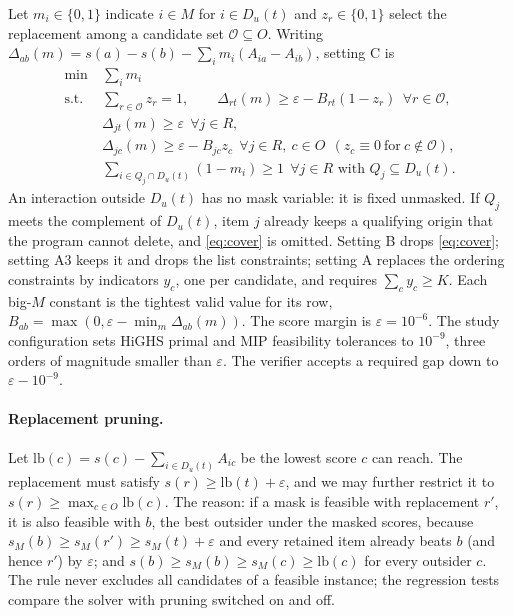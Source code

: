 \documentclass[11pt]{article}
\begin{document}
Let $m_i\in\{0,1\}$ indicate $i\in M$ for $i\in D_u(t)$ and $z_r\in\{0,1\}$ select the replacement among a candidate
set $\mathcal{O}\subseteq O$. Writing $\Delta_{ab}(m)=s(a)-s(b)-\sum_im_i(A_{ia}-A_{ib})$, setting C is
\begin{align}
\min\ &\textstyle\sum_i m_i \nonumber\\
\text{s.t. }&\textstyle\sum_{r\in\mathcal{O}}z_r=1, \qquad \Delta_{rt}(m)\ge\varepsilon-B_{rt}(1-z_r)\ \ \forall r\in\mathcal{O},\\
&\Delta_{jt}(m)\ge\varepsilon\ \ \forall j\in R,\\
&\Delta_{jc}(m)\ge\varepsilon-B_{jc}z_c\ \ \forall j\in R,\ c\in O\ \ (z_c\equiv0\ \text{for}\ c\notin\mathcal{O}),\label{eq:threat}\\
&\textstyle\sum_{i\in Q_j\cap D_u(t)}(1-m_i)\ge1\ \ \forall j\in R \text{ with } Q_j\subseteq D_u(t).\label{eq:cover}
\end{align}
An interaction outside $D_u(t)$ has no mask variable: it is fixed unmasked. If $Q_j$ meets the complement of
$D_u(t)$, item $j$ already keeps a qualifying origin that the program cannot delete, and \eqref{eq:cover} is omitted.
Setting B drops \eqref{eq:cover}; setting A3 keeps it and drops the list constraints; setting A replaces the ordering
constraints by indicators $y_c$, one per candidate, and requires $\sum_cy_c\ge K$. Each big-$M$ constant is the
tightest valid value for its row, $B_{ab}=\max(0,\varepsilon-\min_m\Delta_{ab}(m))$. The score margin is
$\varepsilon=10^{-6}$. The study configuration sets HiGHS primal and MIP feasibility tolerances to $10^{-9}$, three
orders of magnitude smaller than $\varepsilon$. The verifier accepts a required gap down to $\varepsilon-10^{-9}$.

\paragraph{Replacement pruning.} Let $\mathrm{lb}(c)=s(c)-\sum_{i\in D_u(t)}A_{ic}$ be the lowest score $c$ can reach.
The replacement must satisfy $s(r)\ge\mathrm{lb}(t)+\varepsilon$, and we may further restrict it to
$s(r)\ge\max_{c\in O}\mathrm{lb}(c)$. The reason: if a mask is feasible with replacement $r'$, it is also feasible with
$b$, the best outsider under the masked scores, because $s_M(b)\ge s_M(r')\ge s_M(t)+\varepsilon$ and every retained
item already beats $b$ (and hence $r'$) by $\varepsilon$; and $s(b)\ge s_M(b)\ge s_M(c)\ge\mathrm{lb}(c)$ for every
outsider $c$. The rule never excludes all candidates of a feasible instance; the regression tests compare the solver
with pruning switched on and off.
\end{document}
